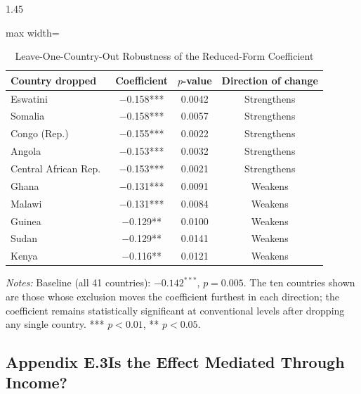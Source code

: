 \documentclass[12pt]{article}
\begin{document}
\begin{bibunit}[jpe]
\begin{spacing}{1.45}
\begin{table}[H]
\centering
\begin{adjustbox}{max width=\textwidth}
\begin{threeparttable}
\caption{Leave-One-Country-Out Robustness of the Reduced-Form Coefficient}
\label{tab:E2}
\begin{tabular}{lccc}
\toprule
Country dropped & Coefficient & $p$-value & Direction of change \\
\midrule
Eswatini & $-$0.158*** & 0.0042 & Strengthens \\
Somalia & $-$0.158*** & 0.0057 & Strengthens \\
Congo (Rep.) & $-$0.155*** & 0.0022 & Strengthens \\
Angola & $-$0.153*** & 0.0032 & Strengthens \\
Central African Rep.\ & $-$0.153*** & 0.0021 & Strengthens \\
Ghana & $-$0.131*** & 0.0091 & Weakens \\
Malawi & $-$0.131*** & 0.0084 & Weakens \\
Guinea & $-$0.129** & 0.0100 & Weakens \\
Sudan & $-$0.129** & 0.0141 & Weakens \\
Kenya & $-$0.116** & 0.0121 & Weakens \\
\bottomrule
\end{tabular}
\begin{tablenotes}[flushleft]
\footnotesize
\item \textit{Notes:} Baseline (all 41 countries): $-0.142^{***}$, $p=0.005$. The ten countries shown are those whose exclusion moves the coefficient furthest in each direction; the coefficient remains statistically significant at conventional levels after dropping any single country. *** $p<0.01$, ** $p<0.05$.
\end{tablenotes}
\end{threeparttable}
\end{adjustbox}
\end{table}

\subsection*{Appendix E.3\quad Is the Effect Mediated Through Income?}


\end{spacing}
\end{bibunit}
\end{document}
